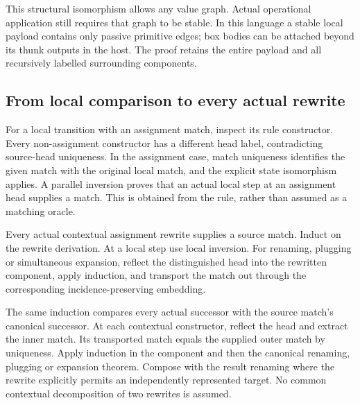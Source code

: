 This structural isomorphism allows any value graph. Actual operational
application still requires that graph to be stable. In this language a stable
local payload contains only passive primitive edges; box bodies can be
attached beyond its thunk outputs in the host. The proof retains the entire
payload and all recursively labelled surrounding components.



\subsection{From local comparison to every actual rewrite}

For a local transition with an assignment match, inspect its rule constructor.
Every non-assignment constructor has a different head label, contradicting
source-head uniqueness. In the assignment case, match uniqueness identifies
the given match with the original local match, and the explicit state
isomorphism applies. A parallel inversion proves that an actual local step
at an assignment head supplies a match. This is obtained from the rule,
rather than assumed as a matching oracle.



Every actual contextual assignment rewrite supplies a source match.
Induct on the rewrite derivation. At a local step use local inversion.
For renaming, plugging or simultaneous expansion, reflect the distinguished
head into the rewritten component, apply induction, and transport the match
out through the corresponding incidence-preserving embedding.


The same induction compares every actual successor with the source match's
canonical successor. At each contextual constructor, reflect the head and
extract the inner match. Its transported match equals the supplied outer
match by uniqueness. Apply induction in the component and then the canonical
renaming, plugging or expansion theorem. Compose with the result renaming
where the rewrite explicitly permits an independently represented target.
No common contextual decomposition of two rewrites is assumed.

